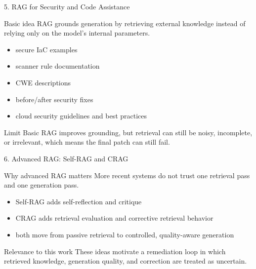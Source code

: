\documentclass[aspectratio=169,10pt]{beamer}
\begin{document}
\begin{frame}{5. RAG for Security and Code Assistance}
\begin{block}{Basic idea}
\small
RAG grounds generation by retrieving external knowledge instead of relying only on the model's internal parameters.
\end{block}
\begin{itemize}
  \item secure IaC examples
  \item scanner rule documentation
  \item CWE descriptions
  \item before/after security fixes
  \item cloud security guidelines and best practices
\end{itemize}
\vspace{0.35cm}
\begin{alertblock}{Limit}
Basic RAG improves grounding, but retrieval can still be noisy, incomplete, or irrelevant, which means the final patch can still fail.
\end{alertblock}
\end{frame}

\begin{frame}{6. Advanced RAG: Self-RAG and CRAG}
\begin{block}{Why advanced RAG matters}
\small
More recent systems do not trust one retrieval pass and one generation pass.
\end{block}
\begin{itemize}
  \item Self-RAG adds self-reflection and critique
  \item CRAG adds retrieval evaluation and corrective retrieval behavior
  \item both move from passive retrieval to controlled, quality-aware generation
\end{itemize}
\vspace{0.35cm}
\begin{alertblock}{Relevance to this work}
These ideas motivate a remediation loop in which retrieved knowledge, generation quality, and correction are treated as uncertain.
\end{alertblock}
\end{frame}
\end{document}
